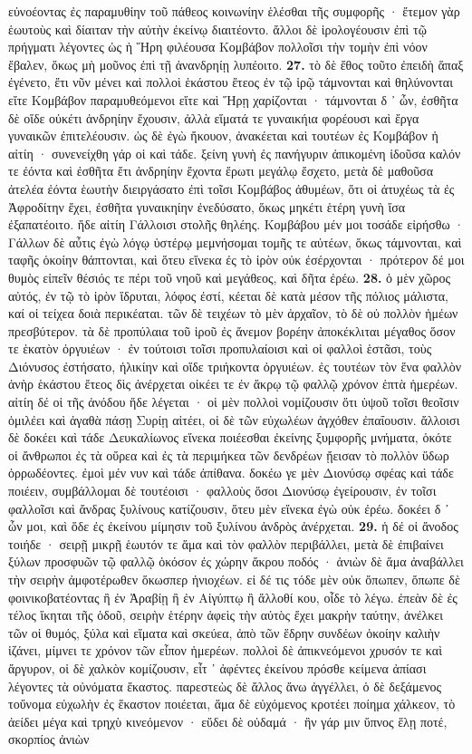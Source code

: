 \documentclass[a4paper, 11pt, oneside, polutonikogreek, german]{article}
\begin{document}
εὐνοέοντας ἐς παραμυθίην τοῦ πάθεος κοινωνίην ἑλέσθαι τῆς συμφορῆς · ἔτεμον γὰρ ἑωυτοὺς καὶ δίαιταν τὴν αὐτὴν ἐκείνῳ διαιτέοντο. ἄλλοι δὲ ἱρολογέουσιν ἐπὶ τῷ πρήγματι λέγοντες ὡς ἡ Ἥρη φιλέουσα Κομβάβον πολλοῖσι τὴν τομὴν ἐπὶ νόον ἔβαλεν, ὅκως μὴ μοῦνος ἐπὶ τῇ ἀνανδρηίῃ λυπέοιτο. \textbf{27.} τὸ δὲ ἔθος τοῦτο ἐπειδὴ ἅπαξ ἐγένετο, ἔτι νῦν μένει καὶ πολλοὶ ἑκάστου ἔτεος ἐν τῷ ἱρῷ τάμνονται καὶ θηλύνονται εἴτε Κομβάβον παραμυθεόμενοι εἴτε καὶ Ἥρῃ χαρίζονται · τάμνονται δ ᾽ ὦν, ἐσθῆτα δὲ οἵδε οὐκέτι ἀνδρηίην ἔχουσιν, ἀλλὰ εἵματά τε γυναικήια φορέουσι καὶ ἔργα γυναικῶν ἐπιτελέουσιν. ὡς δὲ ἐγὼ ἤκουον, ἀνακέεται καὶ τουτέων ἐς Κομβάβον ἡ αἰτίη · συνενείχθη γάρ οἱ καὶ τάδε. ξείνη γυνὴ ἐς πανήγυριν ἀπικομένη ἰδοῦσα καλόν τε ἐόντα καὶ ἐσθῆτα ἔτι ἀνδρηίην ἔχοντα ἔρωτι μεγάλῳ ἔσχετο, μετὰ δὲ μαθοῦσα ἀτελέα ἐόντα ἑωυτὴν διειργάσατο ἐπὶ τοῖσι Κομβάβος ἀθυμέων, ὅτι οἱ ἀτυχέως τὰ ἐς Ἀφροδίτην ἔχει, ἐσθῆτα γυναικηίην ἐνεδύσατο, ὅκως μηκέτι ἑτέρη γυνὴ ἴσα ἐξαπατέοιτο. ἥδε αἰτίη Γάλλοισι στολῆς θηλέης. Κομβάβου μέν μοι τοσάδε εἰρήσθω · Γάλλων δὲ αὖτις ἐγὼ λόγῳ ὑστέρῳ μεμνήσομαι τομῆς τε αὐτέων, ὅκως τάμνονται, καὶ ταφῆς ὁκοίην θάπτονται, καὶ ὅτευ εἵνεκα ἐς τὸ ἱρὸν οὐκ ἐσέρχονται · πρότερον δέ μοι θυμὸς εἰπεῖν θέσιός τε πέρι τοῦ νηοῦ καὶ μεγάθεος, καὶ δῆτα ἐρέω. \textbf{28.} ὁ μὲν χῶρος αὐτός, ἐν τῷ τὸ ἱρὸν ἵδρυται, λόφος ἐστί, κέεται δὲ κατὰ μέσον τῆς πόλιος μάλιστα, καί οἱ τείχεα δοιὰ περικέαται. τῶν δὲ τειχέων τὸ μὲν ἀρχαῖον, τὸ δὲ οὐ πολλὸν ἡμέων πρεσβύτερον. τὰ δὲ προπύλαια τοῦ ἱροῦ ἐς ἄνεμον βορέην ἀποκέκλιται μέγαθος ὅσον τε ἑκατὸν ὀργυιέων · ἐν τούτοισι τοῖσι προπυλαίοισι καὶ οἱ φαλλοὶ ἑστᾶσι, τοὺς Διόνυσος ἐστήσατο, ἡλικίην καὶ οἵδε τριήκοντα ὀργυιέων. ἐς τουτέων τὸν ἕνα φαλλὸν ἀνὴρ ἑκάστου ἔτεος δὶς ἀνέρχεται οἰκέει τε ἐν ἄκρῳ τῷ φαλλῷ χρόνον ἑπτὰ ἡμερέων. αἰτίη δέ οἱ τῆς ἀνόδου ἥδε λέγεται · οἱ μὲν πολλοὶ νομίζουσιν ὅτι ὑψοῦ τοῖσι θεοῖσιν ὁμιλέει καὶ ἀγαθὰ πάσῃ Συρίῃ αἰτέει, οἱ δὲ τῶν εὐχωλέων ἀγχόθεν ἐπαΐουσιν. ἄλλοισι δὲ δοκέει καὶ τάδε Δευκαλίωνος εἵνεκα ποιέεσθαι ἐκείνης ξυμφορῆς μνήματα, ὁκότε οἱ ἄνθρωποι ἐς τὰ οὔρεα καὶ ἐς τὰ περιμήκεα τῶν δενδρέων ᾔεισαν τὸ πολλὸν ὕδωρ ὀρρωδέοντες. ἐμοὶ μέν νυν καὶ τάδε ἀπίθανα. δοκέω γε μὲν Διονύσῳ σφέας καὶ τάδε ποιέειν, συμβάλλομαι δὲ τουτέοισι · φαλλοὺς ὅσοι Διονύσῳ ἐγείρουσιν, ἐν τοῖσι φαλλοῖσι καὶ ἄνδρας ξυλίνους κατίζουσιν, ὅτευ μὲν εἵνεκα ἐγὼ οὐκ ἐρέω. δοκέει δ ᾽ ὦν μοι, καὶ ὅδε ἐς ἐκείνου μίμησιν τοῦ ξυλίνου ἀνδρὸς ἀνέρχεται. \textbf{29.} ἡ δέ οἱ ἄνοδος τοιήδε · σειρῇ μικρῇ ἑωυτόν τε ἅμα καὶ τὸν φαλλὸν περιβάλλει, μετὰ δὲ ἐπιβαίνει ξύλων προσφυῶν τῷ φαλλῷ ὁκόσον ἐς χώρην ἄκρου ποδός · ἀνιὼν δὲ ἅμα ἀναβάλλει τὴν σειρὴν ἀμφοτέρωθεν ὅκωσπερ ἡνιοχέων. εἰ δέ τις τόδε μὲν οὐκ ὄπωπεν, ὄπωπε δὲ φοινικοβατέοντας ἢ ἐν Ἀραβίῃ ἢ ἐν Αἰγύπτῳ ἢ ἄλλοθί κου, οἶδε τὸ λέγω. ἐπεὰν δὲ ἐς τέλος ἵκηται τῆς ὁδοῦ, σειρὴν ἑτέρην ἀφεὶς τὴν αὐτὸς ἔχει μακρὴν ταύτην, ἀνέλκει τῶν οἱ θυμός, ξύλα καὶ εἵματα καὶ σκεύεα, ἀπὸ τῶν ἕδρην συνδέων ὁκοίην καλιὴν ἱζάνει, μίμνει τε χρόνον τῶν εἶπον ἡμερέων. πολλοὶ δὲ ἀπικνεόμενοι χρυσόν τε καὶ ἄργυρον, οἱ δὲ χαλκὸν κομίζουσιν, εἶτ ᾽ ἀφέντες ἐκείνου πρόσθε κείμενα ἀπίασι λέγοντες τὰ οὐνόματα ἕκαστος. παρεστεὼς δὲ ἄλλος ἄνω ἀγγέλλει, ὁ δὲ δεξάμενος τοὔνομα εὐχωλὴν ἐς ἕκαστον ποιέεται, ἅμα δὲ εὐχόμενος κροτέει ποίημα χάλκεον, τὸ ἀείδει μέγα καὶ τρηχὺ κινεόμενον · εὕδει δὲ οὐδαμά · ἢν γάρ μιν ὕπνος ἕλῃ ποτέ, σκορπίος ἀνιὼν 
\end{document}
